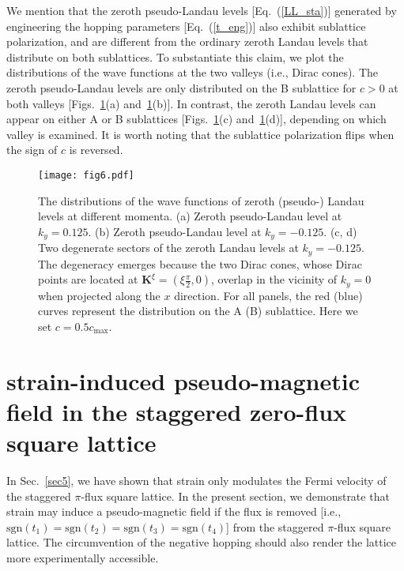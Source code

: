\documentclass[aps, twocolumn, floatfix, superscriptaddress, prb]{revtex4-1}
\begin{document}
{We mention that the zeroth pseudo-Landau levels [Eq.~(\ref{LL_sta})] generated by engineering the hopping parameters [Eq.~(\ref{t_eng})] also exhibit sublattice polarization, and are different from the ordinary zeroth Landau levels that distribute on both sublattices. To substantiate this claim, we plot the distributions of the wave functions at the two valleys (i.e., Dirac cones). The zeroth pseudo-Landau levels are only distributed on the B sublattice for $c>0$ at both valleys [Figs.~\ref{fig6}(a) and~\ref{fig6}(b)]. In contrast, the zeroth Landau levels can appear on either A or B sublattices [Figs.~\ref{fig6}(c) and~\ref{fig6}(d)], depending on which valley is examined. It is worth noting that the sublattice polarization flips when the sign of $c$ is reversed.}

%
\begin{figure}[t]
\centering
\texttt{[image: fig6.pdf]}
\caption{The distributions of the wave functions of zeroth (pseudo-) Landau levels at different momenta. (a) Zeroth pseudo-Landau level at {$k_y=0.125$}. (b) Zeroth pseudo-Landau level at {$k_y=-0.125$}. (c, d) Two degenerate sectors of the zeroth Landau levels at {$k_y=-0.125$}. The degeneracy emerges because the two Dirac cones, whose Dirac points are located at $\bm K^\xi=(\xi\tfrac{\pi}{2},0)$, overlap in the vicinity of $k_y=0$ when projected along the $x$ direction. For all panels, the red (blue) curves represent the distribution on the A (B) sublattice. Here we set $c=0.5c_{\text{max}}$.
}\label{fig6}
\end{figure}
%





\section{strain-induced pseudo-magnetic field in the staggered zero-flux square lattice}
\label{sec6}
{In Sec.~\ref{sec5}, we have shown that strain only modulates the Fermi velocity of the staggered $\pi$-flux square lattice. In the present section, we demonstrate that strain may induce a pseudo-magnetic field if the flux is removed [i.e., $\text{sgn}(t_1)=\text{sgn}(t_2)=\text{sgn}(t_3)=\text{sgn}(t_4)$] from the staggered $\pi$-flux square lattice. The circumvention of the negative hopping should also render the lattice more experimentally accessible.}
\end{document}
